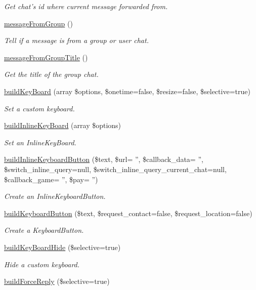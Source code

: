 \begin{DoxyCompactItemize}
\begin{DoxyCompactList}\small\item\em Get chat's id where current message forwarded from. \end{DoxyCompactList}\item 
\hyperlink{class_telegram_a59b7bf91ea3b26d732f7536c2d65da19}{message\-From\-Group} ()
\begin{DoxyCompactList}\small\item\em Tell if a message is from a group or user chat. \end{DoxyCompactList}\item 
\hyperlink{class_telegram_acd2c4c8c6f15dbb1f25af2f539c2ec16}{message\-From\-Group\-Title} ()
\begin{DoxyCompactList}\small\item\em Get the title of the group chat. \end{DoxyCompactList}\item 
\hyperlink{class_telegram_a5c9619923ae1810aa340fa0e9acc1744}{build\-Key\-Board} (array \$options, \$onetime=false, \$resize=false, \$selective=true)
\begin{DoxyCompactList}\small\item\em Set a custom keyboard. \end{DoxyCompactList}\item 
\hyperlink{class_telegram_a81212e5e1fe0b3f72dd503a71577bbc4}{build\-Inline\-Key\-Board} (array \$options)
\begin{DoxyCompactList}\small\item\em Set an Inline\-Key\-Board. \end{DoxyCompactList}\item 
\hyperlink{class_telegram_a7f9a043a4713bce87d59b37fd1390251}{build\-Inline\-Keyboard\-Button} (\$text, \$url= '', \$callback\-\_\-data= '', \$switch\-\_\-inline\-\_\-query=null, \$switch\-\_\-inline\-\_\-query\-\_\-current\-\_\-chat=null, \$callback\-\_\-game= '', \$pay= '')
\begin{DoxyCompactList}\small\item\em Create an Inline\-Keyboard\-Button. \end{DoxyCompactList}\item 
\hyperlink{class_telegram_a611a52a2e9be838207b3943007a76b6c}{build\-Keyboard\-Button} (\$text, \$request\-\_\-contact=false, \$request\-\_\-location=false)
\begin{DoxyCompactList}\small\item\em Create a Keyboard\-Button. \end{DoxyCompactList}\item 
\hyperlink{class_telegram_a3a02a8bbaf6021f98871752bfd32de97}{build\-Key\-Board\-Hide} (\$selective=true)
\begin{DoxyCompactList}\small\item\em Hide a custom keyboard. \end{DoxyCompactList}\item 
\hypertarget{class_telegram_a34cfc8575c348ca3dd168b9611af4f1c}{\hyperlink{class_telegram_a34cfc8575c348ca3dd168b9611af4f1c}{build\-Force\-Reply} (\$selective=true)}\label{class_telegram_a34cfc8575c348ca3dd168b9611af4f1c}


\end{DoxyCompactItemize}
